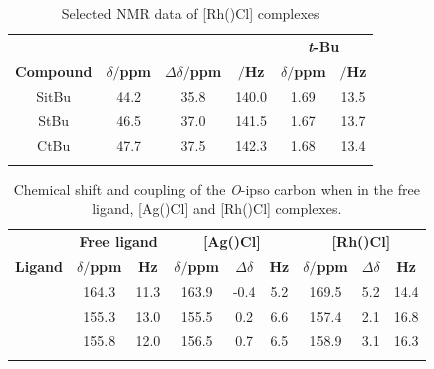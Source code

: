 \begin{table}[htbp]
\caption[Selected NMR data of [Rh(\tBuxantphos)Cl{]} complexes]{Selected NMR data of [Rh(\tBuxantphos)Cl] complexes}
\vspace{1em}
\label{table:rhodiumchloride}
\small
\begin{center}
\begin{tabular}{ c c c c c c}
	\toprule{}
	~ & \multicolumn{3}{c}{\bfseries{\phosphorus}} & \multicolumn{2}{c}{\bfseries{\proton{} \emph{t}-Bu}}\\
	\cmidrule(lr){2-4} \cmidrule(lr){5-6} 
	\bfseries{Compound}&\bfseries{$\delta/$ppm}&\bfseries{$\Delta\delta/$ppm}&\bfseries{\JRhP{}$/$Hz}&\bfseries{$\delta/$ppm}&\bfseries{\J $/$Hz}\\
	\midrule{}
	SitBu	&	44.2	&	35.8	&	140.0	& 1.69	& 13.5\\
	StBu		& 	46.5	&	37.0	&	141.5	& 1.67	& 13.7\\
	CtBu		&	47.7	&	37.5	&	142.3	& 1.68	& 13.4\\
	\bottomrule{}
\end{tabular}
\end{center}
\end{table}

\begin{table}[htbp]
\caption[Chemical shift and coupling of the \emph{O}-ipso carbon when in the free ligand, [Ag(\tBuxantphos)Cl{]} and [Rh(\tBuxantphos)Cl{]} complexes]{Chemical shift and coupling of the \emph{O}-ipso carbon when in the free ligand, [Ag(\tBuxantphos)Cl] and [Rh(\tBuxantphos)Cl] complexes.}
\vspace{1em}
\label{table:oxygenbindingrh}
\small
\begin{center}
\begin{tabular}{ c c c c c c c c c}
	\toprule{}
	~&\multicolumn{2}{c}{\bfseries{Free ligand}} &\multicolumn{3}{c}{\bfseries{[Ag(\tBuxantphos)Cl]}}&\multicolumn{3}{c}{\bfseries{[Rh(\tBuxantphos)Cl]}}\\
	\cmidrule(lr){2-3} \cmidrule(lr){4-6} \cmidrule(lr){7-9}
	\bfseries{Ligand}&\bfseries{$\delta$\carbon{}$/$ppm}&\bfseries{\J{} Hz}&\bfseries{$\delta$\carbon{}$/$ppm}&\bfseries{$\Delta\delta$}&\bfseries{\J{} Hz}&\bfseries{$\delta$\carbon{}$/$ppm}&\bfseries{$\Delta\delta$}&\bfseries{\J{} Hz}\\
	\midrule{}
	\tBusixantphos	&	164.3	& 11.3	&	163.9	& -0.4	& 5.2		& 169.5	& 5.2 	& 14.4 \\
	\tButhixantphos	&	155.3	& 13.0	&	155.5	& 0.2 	& 6.6 	& 157.4	& 2.1 	&16.8 \\
	\tBuxantphos	&	155.8	& 12.0	&	156.5	& 0.7		& 6.5		& 158.9	& 3.1		& 16.3 \\
	\bottomrule{}
\end{tabular}
\end{center}
\end{table}

